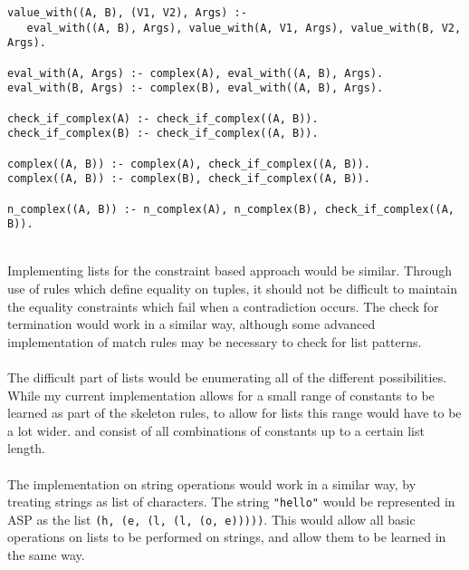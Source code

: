 \begin{lstlisting}
value_with((A, B), (V1, V2), Args) :-
   eval_with((A, B), Args), value_with(A, V1, Args), value_with(B, V2, Args).

eval_with(A, Args) :- complex(A), eval_with((A, B), Args).
eval_with(B, Args) :- complex(B), eval_with((A, B), Args).

check_if_complex(A) :- check_if_complex((A, B)).
check_if_complex(B) :- check_if_complex((A, B)).

complex((A, B)) :- complex(A), check_if_complex((A, B)).
complex((A, B)) :- complex(B), check_if_complex((A, B)).

n_complex((A, B)) :- n_complex(A), n_complex(B), check_if_complex((A, B)).
\end{lstlisting}
\mbox{}\\
Implementing lists for the constraint based approach would be similar. Through use of rules which define equality on tuples, it should not be difficult to maintain the equality constraints which fail when a contradiction occurs. The check for termination would work in a similar way, although some advanced implementation of match rules may be necessary to check for list patterns. \\ \\
The difficult part of lists would be enumerating all of the different possibilities. While my current implementation allows for a small range of constants to be learned as part of the skeleton rules, to allow for lists this range would have to be a lot wider. and consist of all combinations of constants up to a certain list length. \\ \\
The implementation on string operations would work in a similar way, by treating strings as list of characters. The string \lstinline{"hello"} would be represented in ASP as the list \lstinline{(h, (e, (l, (l, (o, e)))))}. This would allow all basic operations on lists to be performed on strings, and allow them to be learned in the same way.

